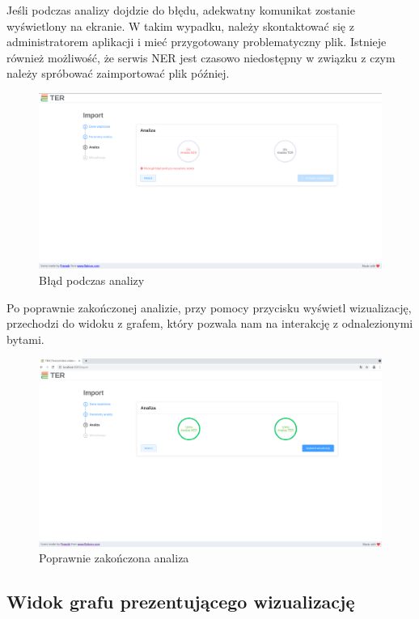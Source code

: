 \documentclass[12pt, a4paper]{article}
\begin{document}
Jeśli podczas analizy dojdzie do błędu, adekwatny komunikat zostanie wyświetlony na ekranie. W takim wypadku, należy skontaktować się z administratorem aplikacji i mieć przygotowany problematyczny plik. Istnieje również możliwość, że serwis NER jest czasowo niedostępny w związku z czym należy spróbować zaimportować plik później.

\begin{figure}[H]
    \centering
    \includegraphics[width=\linewidth]{images/analiza-error.png}
    \caption{Błąd podczas analizy}
\end{figure}

Po poprawnie zakończonej analizie, przy pomocy przycisku wyświetl wizualizację, przechodzi do widoku z grafem, który pozwala nam na interakcję z odnalezionymi bytami.

\begin{figure}[H]
    \centering
    \includegraphics[width=\linewidth]{images/analiza-success.png}
    \caption{Poprawnie zakończona analiza}
\end{figure}

\subsection{Widok grafu prezentującego wizualizację}\label{section:graph}
\end{document}
